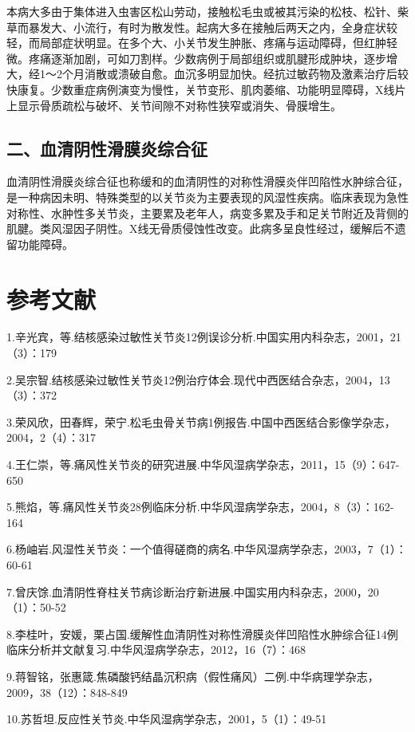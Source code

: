 本病大多由于集体进入虫害区松山劳动，接触松毛虫或被其污染的松枝、松针、柴草而暴发大、小流行，有时为散发性。起病大多在接触后两天之内，全身症状较轻，而局部症状明显。在多个大、小关节发生肿胀、疼痛与运动障碍，但红肿轻微。疼痛逐渐加剧，可如刀割样。少数病例于局部组织或肌腱形成肿块，逐步增大，经1～2个月消散或溃破自愈。血沉多明显加快。经抗过敏药物及激素治疗后较快康复。少数重症病例演变为慢性，关节变形、肌肉萎缩、功能明显障碍，X线片上显示骨质疏松与破坏、关节间隙不对称性狭窄或消失、骨膜增生。

\subsection{二、血清阴性滑膜炎综合征}

血清阴性滑膜炎综合征也称缓和的血清阴性的对称性滑膜炎伴凹陷性水肿综合征，是一种病因未明、特殊类型的以关节炎为主要表现的风湿性疾病。临床表现为急性对称性、水肿性多关节炎，主要累及老年人，病变多累及手和足关节附近及背侧的肌腱。类风湿因子阴性。X线无骨质侵蚀性改变。此病多呈良性经过，缓解后不遗留功能障碍。

\protect\hypertarget{text00327.html}{}{}

\section{参考文献}

1.辛光宾，等.结核感染过敏性关节炎12例误诊分析.中国实用内科杂志，2001，21（3）：179

2.吴宗智.结核感染过敏性关节炎12例治疗体会.现代中西医结合杂志，2004，13（3）：372

3.荣风欣，田春辉，荣宁.松毛虫骨关节病1例报告.中国中西医结合影像学杂志，2004，2（4）：317

4.王仁崇，等.痛风性关节炎的研究进展.中华风湿病学杂志，2011，15（9）：647-650

5.熊焰，等.痛风性关节炎28例临床分析.中华风湿病学杂志，2004，8（3）：162-164

6.杨岫岩.风湿性关节炎：一个值得磋商的病名.中华风湿病学杂志，2003，7（1）：60-61

7.曾庆馀.血清阴性脊柱关节病诊断治疗新进展.中国实用内科杂志，2000，20（1）：50-52

8.李桂叶，安媛，栗占国.缓解性血清阴性对称性滑膜炎伴凹陷性水肿综合征14例临床分析并文献复习.中华风湿病学杂志，2012，16（7）：468

9.蒋智铭，张惠箴.焦磷酸钙结晶沉积病（假性痛风）二例.中华病理学杂志，2009，38（12）：848-849

10.苏哲坦.反应性关节炎.中华风湿病学杂志，2001，5（1）：49-51

\protect\hypertarget{text00328.html}{}{}

